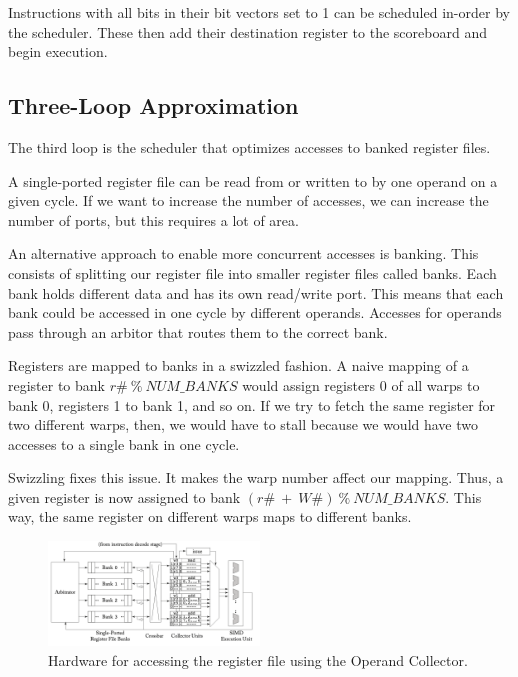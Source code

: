Instructions with all bits in their bit vectors set to 1 can be scheduled in-order by the scheduler.
These then add their destination register to the scoreboard and begin execution.


\subsection{Three-Loop Approximation}

The third loop is the scheduler that optimizes accesses to banked register files.

A single-ported register file can be read from or written to by one operand on a given cycle.
If we want to increase the number of accesses, we can increase the number of ports, but
this requires a lot of area.

An alternative approach to enable more concurrent accesses is banking. This consists of splitting
our register file into smaller register files called banks. Each bank holds different
data and has its own read/write port. This means that each bank could be accessed in one
cycle by different operands. Accesses for operands pass through an arbitor that routes
them to the correct bank.

Registers are mapped to banks in a swizzled fashion. A naive mapping of a register to bank $r\# \ \% \ NUM\_BANKS$ would
assign registers 0 of all warps to bank 0, registers 1 to bank 1, and so on. If we try to fetch
the same register for two different warps, then, we would have to stall because we would have
two accesses to a single bank in one cycle.

Swizzling fixes this issue. It makes the warp number affect our mapping. Thus, a given register is now
assigned to bank $(r\# \ + \ W\#) \ \% \ NUM\_BANKS$.
This way, the same register on different warps maps to different banks.

\begin{figure}[h]
    \centering
    \includegraphics[width=0.5\textwidth]{assets/operand.png}
    \caption{Hardware for accessing the register file using the Operand Collector.}
    \label{fig:opcoll}
\end{figure}

